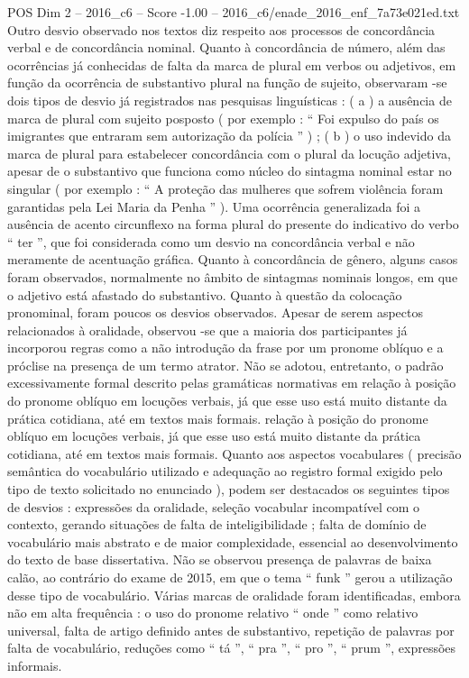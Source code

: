 \begin{textsample}{POS Dim 2 – 2016\_c6 – Score -1.00 – 2016\_c6/enade\_2016\_enf\_7a73e021ed.txt}
Outro desvio observado nos textos diz respeito aos processos de concordância verbal e de concordância nominal.
Quanto à concordância de número, além das ocorrências já conhecidas de falta da marca de plural em verbos ou adjetivos, em função da ocorrência de substantivo plural na função de sujeito, observaram -se dois tipos de desvio já registrados nas pesquisas linguísticas : ( a ) a ausência de marca de plural com sujeito posposto ( por exemplo : “ Foi expulso do país os imigrantes que entraram sem autorização da polícia ” ) ; ( b ) o uso indevido da marca de plural para estabelecer concordância com o plural da locução adjetiva, apesar de o substantivo que funciona como núcleo do sintagma nominal estar no singular ( por exemplo : “ A proteção das mulheres que sofrem violência foram garantidas pela Lei Maria da Penha ” ).
Uma ocorrência generalizada foi a ausência de acento circunflexo na forma plural do presente do indicativo do verbo “ ter ”, que foi considerada como um desvio na concordância verbal e não meramente de acentuação gráfica.
Quanto à concordância de gênero, alguns casos foram observados, normalmente no âmbito de sintagmas nominais longos, em que o adjetivo está afastado do substantivo.
Quanto à questão da colocação pronominal, foram poucos os desvios observados.
Apesar de serem aspectos relacionados à oralidade, observou -se que a maioria dos participantes já incorporou regras como a não introdução da frase por um pronome oblíquo e a próclise na presença de um termo atrator.
Não se adotou, entretanto, o padrão excessivamente formal descrito pelas gramáticas normativas em relação à posição do pronome oblíquo em locuções verbais, já que esse uso está muito distante da prática cotidiana, até em textos mais formais. relação à posição do pronome oblíquo em locuções verbais, já que esse uso está muito distante da prática cotidiana, até em textos mais formais.
Quanto aos aspectos vocabulares ( precisão semântica do vocabulário utilizado e adequação ao registro formal exigido pelo tipo de texto solicitado no enunciado ), podem ser destacados os seguintes tipos de desvios : expressões da oralidade, seleção vocabular incompatível com o contexto, gerando situações de falta de inteligibilidade ; falta de domínio de vocabulário mais abstrato e de maior complexidade, essencial ao desenvolvimento do texto de base dissertativa.
Não se observou presença de palavras de baixa calão, ao contrário do exame de 2015, em que o tema “ funk ” gerou a utilização desse tipo de vocabulário.
Várias marcas de oralidade foram identificadas, embora não em alta frequência : o uso do pronome relativo “ onde ” como relativo universal, falta de artigo definido antes de substantivo, repetição de palavras por falta de vocabulário, reduções como “ tá ”, “ pra ”, “ pro ”, “ prum ”, expressões informais.

\end{textsample}
